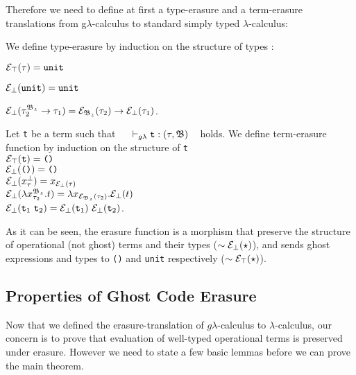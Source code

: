 Therefore we need to define at first a type-erasure and a term-erasure translations from g$\lambda$-calculus to standard simply typed  
$\lambda$-calculus:  

\begin{dfn} 
\label{type-erasure}
We define type-erasure by induction on the structure of types : \vspace{0.2cm} 

\noindent$ \mathcal{E}_{\top}(\tau) = \texttt{unit} $ 

\noindent$ \mathcal{E}_{\bot}(\texttt{unit}) = \texttt{unit}$ 

\noindent$ \mathcal{E}_{\bot}(\tau_{2}^{\mathfrak{B_{2}}} \rightarrow \tau_{1})  
= \mathcal{E}_{\mathfrak{B_{2}}}(\tau_{2}) \rightarrow \mathcal{E}_{\bot}(\tau_{1}) $. \\
\end{dfn} 

\begin{dfn} 
\label{term-erasure}
Let \texttt{t} be a term such that 
~~ $\vdash_{g\lambda} \texttt{t} : (\tau, \mathfrak{B})$ ~ holds. 
We define term-erasure function by induction on 
the structure of \texttt{t}\\[0.1cm]
$ \mathcal{E}_{\top}(\texttt{t}) = \texttt{()}$\\[0.05cm]
$\mathcal{E}_{\bot}(\texttt{()}) = \texttt{()}$\\[0.05cm]
$\mathcal{E}_{\bot}(x_{\tau}^{\bot}) = x_{\mathcal{E}_{\bot}(\tau)}$\\[0.05cm]  
$\mathcal{E}_{\bot}(\lambda x_{\tau_{2}}^{\mathfrak{B_{2}}}.t) 
= \lambda x_{\mathcal{E}_{\mathfrak{B_{2}}}(\tau_{2})}. \mathcal{E}_{\bot}(t)$\\[0.05cm]  
$\mathcal{E}_{\bot}(\texttt{t}_{1} ~ \texttt{t}_{2}) 
= \mathcal{E}_{\bot}(\texttt{t}_{1})  ~ \mathcal{E}_{\bot}(\texttt{t}_{2})$.
\end{dfn}
As it can be seen, the erasure function is a morphism that preserve
the structure of operational (not ghost) terms and their types ($\sim\mathcal{E}_{\bot}(\star)$), and sends ghost expressions and types to \texttt{()} and \texttt{unit} respectively ($\sim\mathcal{E}_{\top}(\star)$).




\subsection{Properties of Ghost Code Erasure}

Now that we defined the erasure-translation of $g\lambda$-calculus to $\lambda$-calculus, our concern is to prove that evaluation of well-typed operational terms is preserved under erasure. However we need to state a 
few basic lemmas before we can prove the main theorem. 



